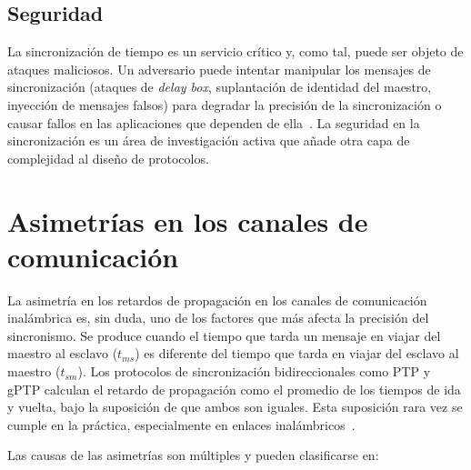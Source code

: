 \subsection{Seguridad}
\label{sec:1.3.6}

La sincronización de tiempo es un servicio crítico y, como tal, puede ser objeto de ataques maliciosos. Un adversario puede intentar manipular los mensajes de sincronización (ataques de \textit{delay box}, suplantación de identidad del maestro, inyección de mensajes falsos) para degradar la precisión de la sincronización o causar fallos en las aplicaciones que dependen de ella~\cite{karami2026}. La seguridad en la sincronización es un área de investigación activa que añade otra capa de complejidad al diseño de protocolos.

\section{Asimetrías en los canales de comunicación}
\label{sec:1.4}

La asimetría en los retardos de propagación en los canales de comunicación inalámbrica es, sin duda, uno de los factores que más afecta la precisión del sincronismo. Se produce cuando el tiempo que tarda un mensaje en viajar del maestro al esclavo ($t_{ms}$) es diferente del tiempo que tarda en viajar del esclavo al maestro ($t_{sm}$). Los protocolos de sincronización bidireccionales como PTP y gPTP calculan el retardo de propagación como el promedio de los tiempos de ida y vuelta, bajo la suposición de que ambos son iguales. Esta suposición rara vez se cumple en la práctica, especialmente en enlaces inalámbricos~\cite{exel2014}.

Las causas de las asimetrías son múltiples y pueden clasificarse en:

